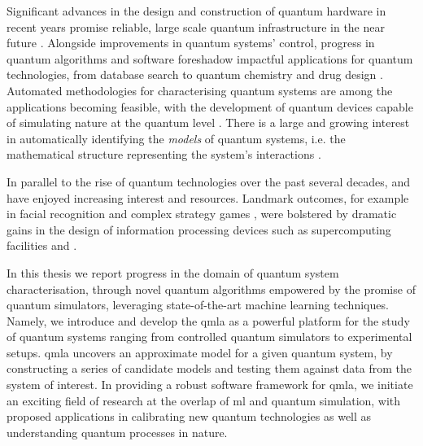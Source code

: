 \glsresetall
Significant advances in the design and construction of quantum hardware in 
    recent years promise reliable, large scale quantum infrastructure
    in the near future \cite{arute2019quantum, zhong2020quantum}. 
Alongside improvements in quantum systems' control, progress in quantum algorithms and software 
    foreshadow impactful applications for quantum technologies, 
    from database search \cite{grover1997quantum} to quantum chemistry \cite{cao2019quantum} and drug design \cite{cao2018potential}.
Automated methodologies for characterising quantum systems are among the applications becoming feasible, 
    with the development of quantum devices capable of
    simulating nature at the quantum level \cite{childs2018toward}. 
There is a large and growing interest in automatically identifying the \emph{models} of quantum systems, 
    i.e. the mathematical structure representing the system's interactions
    \cite{rigo2020machine, cranmer2020discovering, bairey2019learning, pickard2011ab, chertkov2018computational}.
\par 

In parallel to the rise of quantum technologies over the past several decades,
     and  have enjoyed increasing interest and resources.
Landmark outcomes, for example in facial recognition \cite{taigman2014deepface} 
    and complex strategy games \cite{silver2017mastering, brown2019superhuman},
    were bolstered by dramatic gains in the design of information processing devices
    such as supercomputing facilities and  \cite{top500, lindholm2008nvidia}.

\par 

In this thesis we report progress in the domain of quantum system characterisation,
    through novel quantum algorithms empowered by the promise of quantum simulators, 
    leveraging state-of-the-art machine learning techniques. 
Namely, we introduce and develop the \gls{qmla} as a powerful platform for the study of 
    quantum systems ranging from controlled quantum simulators to experimental setups.
\gls{qmla} uncovers an approximate model for a given quantum system, 
    by constructing a series of candidate models and testing them against data from the system of interest.
In providing a robust software framework for \gls{qmla}, we initiate an exciting field of research 
    at the overlap of \gls{ml} and quantum simulation, 
    with proposed applications in calibrating new quantum technologies as well as understanding 
    quantum processes in nature.

